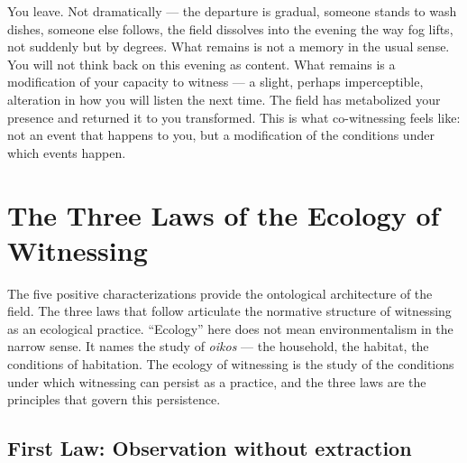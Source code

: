 You leave. Not dramatically — the departure is gradual, someone stands to wash dishes, someone else follows, the field dissolves into the evening the way fog lifts, not suddenly but by degrees. What remains is not a memory in the usual sense. You will not think back on this evening as content. What remains is a modification of your capacity to witness — a slight, perhaps imperceptible, alteration in how you will listen the next time. The field has metabolized your presence and returned it to you transformed. This is what co-witnessing feels like: not an event that happens to you, but a modification of the conditions under which events happen.

\section{The Three Laws of the Ecology of Witnessing}

The five positive characterizations provide the ontological architecture of the field. The three laws that follow articulate the normative structure of witnessing as an ecological practice. ``Ecology'' here does not mean environmentalism in the narrow sense. It names the study of \emph{oikos} --- the household, the habitat, the conditions of habitation. The ecology of witnessing is the study of the conditions under which witnessing can persist as a practice, and the three laws are the principles that govern this persistence.

\subsection{First Law: Observation without extraction}


